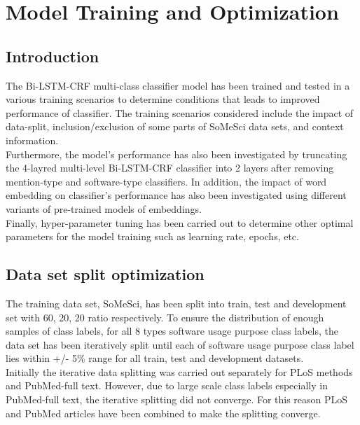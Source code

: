 \chapter{Model Training and Optimization}
\label{ch:chapter06}
 
%
%
\section{Introduction}
\label{sec:chapter06:intro}

The Bi-LSTM-CRF multi-class classifier model has been trained and tested in a various training scenarios to determine conditions that leads to improved performance of classifier. 
The training scenarios considered include the impact of data-split, inclusion/exclusion of some parts of SoMeSci data sets, and context information. \\ 

Furthermore, the model’s performance has also been investigated by truncating the 4-layred multi-level Bi-LSTM-CRF classifier into 2 layers after removing mention-type and software-type classifiers. 
In addition, the impact of word embedding on classifier’s performance  has also been investigated using different variants of pre-trained models of embeddings. \\

Finally, hyper-parameter tuning has been carried out to determine other optimal parameters for the model training such as  learning rate, epochs, etc.

\section{Data set split optimization}
\label{sec:chapter06:split}

The training data set, \ac{SoMeSci}, has been split into train, test and development set with  60, 20, 20 ratio respectively. To ensure the distribution  of enough samples of class labels, for all 8 types software usage purpose class labels, the data set has been iteratively split until each of software usage purpose class label lies within +/- 5\%  range for all train, test and development datasets. \\
 
Initially the iterative data splitting was carried out separately for PLoS methods and PubMed-full text. However, due to large scale class labels especially in PubMed-full text, the iterative splitting did not converge. For this reason PLoS and PubMed articles have been combined to make the splitting converge. \\

